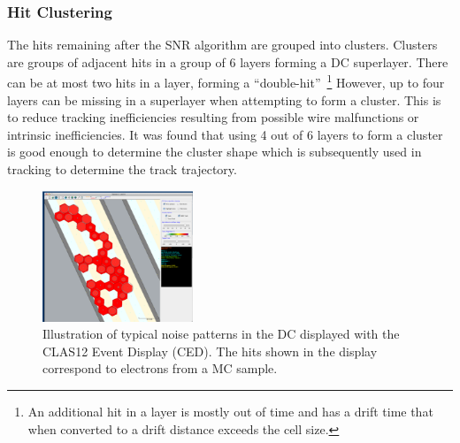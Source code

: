\subsubsection{Hit Clustering}
The hits remaining after the SNR
algorithm are grouped into clusters.
Clusters are groups of adjacent hits in a group of 6 layers forming a DC superlayer.  There can be at most
two hits in a layer, forming a ``double-hit''~\footnote{An additional hit in a layer is mostly out of time and has 
a drift time that when converted to a drift distance exceeds the cell size. }  However, up to four layers can be missing in a superlayer
when attempting to form a cluster.  This is to reduce tracking inefficiencies resulting from possible wire malfunctions or
intrinsic inefficiencies. It was found that using 4 out of 6 layers to form a cluster is good enough
to determine the cluster shape which is subsequently used in tracking to determine the track trajectory. 
\begin{figure}
\centering
\includegraphics[width=0.4\textwidth]{pics/elooper.png}
\caption{
Illustration of typical noise patterns in the DC displayed with the CLAS12 Event Display (CED). 
The hits shown in the display correspond to electrons from a MC sample.
}
\label{fig:eloop}
\end{figure}

